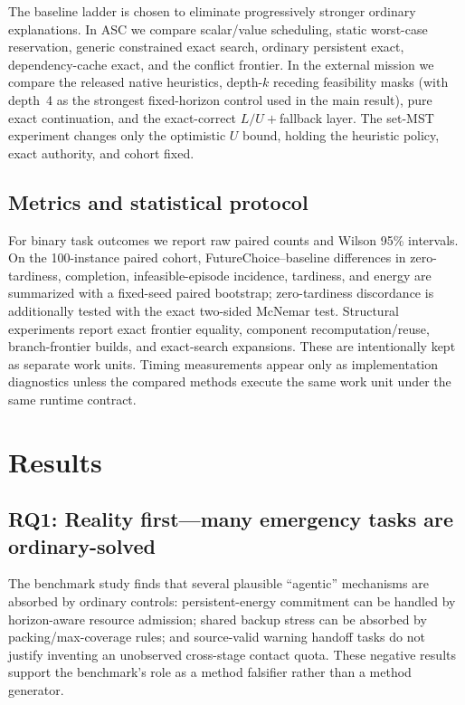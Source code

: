 \documentclass[conference]{IEEEtran}
\begin{document}
The baseline ladder is chosen to eliminate progressively stronger ordinary explanations. In ASC we compare scalar/value scheduling, static worst-case reservation, generic constrained exact search, ordinary persistent exact, dependency-cache exact, and the conflict frontier. In the external mission we compare the released native heuristics, depth-$k$ receding feasibility masks (with depth~4 as the strongest fixed-horizon control used in the main result), pure exact continuation, and the exact-correct $L/U+$fallback layer. The set-MST experiment changes only the optimistic $U$ bound, holding the heuristic policy, exact authority, and cohort fixed.

\subsection{Metrics and statistical protocol}
For binary task outcomes we report raw paired counts and Wilson 95\% intervals. On the 100-instance paired cohort, FutureChoice--baseline differences in zero-tardiness, completion, infeasible-episode incidence, tardiness, and energy are summarized with a fixed-seed paired bootstrap; zero-tardiness discordance is additionally tested with the exact two-sided McNemar test. Structural experiments report exact frontier equality, component recomputation/reuse, branch-frontier builds, and exact-search expansions. These are intentionally kept as separate work units. Timing measurements appear only as implementation diagnostics unless the compared methods execute the same work unit under the same runtime contract.

\section{Results}
\label{sec:results}
\subsection{RQ1: Reality first---many emergency tasks are ordinary-solved}
The benchmark study finds that several plausible ``agentic'' mechanisms are absorbed by ordinary controls: persistent-energy commitment can be handled by horizon-aware resource admission; shared backup stress can be absorbed by packing/max-coverage rules; and source-valid warning handoff tasks do not justify inventing an unobserved cross-stage contact quota. These negative results support the benchmark's role as a method falsifier rather than a method generator.

\begin{table}[t]
\centering
\caption{Deterministic Layer-1 landscape on frozen test coordinates. The table reports the best ordinary baseline by mean TDR only; ties are retained rather than broken post hoc. High TDR does not imply full operational success, and failure classes remain separately visible.}
\label{tab:layer1landscape}
\footnotesize

\end{table}
\end{document}
